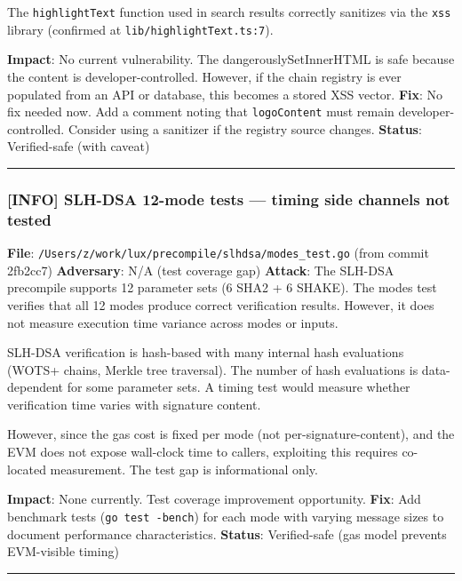 \documentclass[
]{article}
\begin{document}
The \texttt{highlightText} function used in search results correctly
sanitizes via the \texttt{xss} library (confirmed at
\texttt{lib/highlightText.ts:7}).

\textbf{Impact}: No current vulnerability. The dangerouslySetInnerHTML
is safe because the content is developer-controlled. However, if the
chain registry is ever populated from an API or database, this becomes a
stored XSS vector. \textbf{Fix}: No fix needed now. Add a comment noting
that \texttt{logoContent} must remain developer-controlled. Consider
using a sanitizer if the registry source changes. \textbf{Status}:
Verified-safe (with caveat)

\begin{center}\rule{0.5\linewidth}{0.5pt}\end{center}

\subsubsection{{[}INFO{]} SLH-DSA 12-mode tests --- timing side channels
not
tested}\label{info-slh-dsa-12-mode-tests--timing-side-channels-not-tested}

\textbf{File}:
\texttt{/Users/z/work/lux/precompile/slhdsa/modes\_test.go} (from commit
2fb2cc7) \textbf{Adversary}: N/A (test coverage gap) \textbf{Attack}:
The SLH-DSA precompile supports 12 parameter sets (6 SHA2 + 6 SHAKE).
The modes test verifies that all 12 modes produce correct verification
results. However, it does not measure execution time variance across
modes or inputs.

SLH-DSA verification is hash-based with many internal hash evaluations
(WOTS+ chains, Merkle tree traversal). The number of hash evaluations is
data-dependent for some parameter sets. A timing test would measure
whether verification time varies with signature content.

However, since the gas cost is fixed per mode (not
per-signature-content), and the EVM does not expose wall-clock time to
callers, exploiting this requires co-located measurement. The test gap
is informational only.

\textbf{Impact}: None currently. Test coverage improvement opportunity.
\textbf{Fix}: Add benchmark tests (\texttt{go\ test\ -bench}) for each
mode with varying message sizes to document performance characteristics.
\textbf{Status}: Verified-safe (gas model prevents EVM-visible timing)

\begin{center}\rule{0.5\linewidth}{0.5pt}\end{center}
\end{document}
